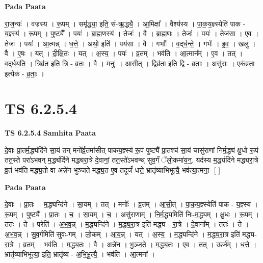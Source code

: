 \documentclass[17pt]{extarticle}
\begin{document}
\textbf{Pada Paata} \newline

रा॒ज॒न्यः॑ । वज्र॑स्य । रू॒पम् । समृ॑द्ध्या॒ इति॒ सं-ऋ॒द्ध्यै॒ । आ॒मिक्षा᳚ । वैश्य॑स्य । पा॒क॒य॒ज्ञ्स्येति॑ पाक - य॒ज्ञ्स्य॑ । रू॒पम् । पुष्ट्यै᳚ । पयः॑ । ब्रा॒ह्म॒णस्य॑ । तेजः॑ । वै । ब्रा॒ह्म॒णः । तेजः॑ । पयः॑ । तेज॑सा । ए॒व । तेजः॑ । पयः॑ । आ॒त्मन्न् । ध॒त्ते॒ । अथो॒ इति॑ । पय॑सा । वै । गर्भाः᳚ । व॒द्‌र्ध॒न्ते॒ । गर्भः॑ । इ॒व॒ । खलु॑ । वै । ए॒षः । यत् । दी॒क्षि॒तः । यत् । अ॒स्य॒ । पयः॑ । व्र॒तम् । भव॑ति । आ॒त्मान᳚म् । ए॒व । तत् । व॒द्‌र्ध॒य॒ति॒ । त्रिव्र॑त॒ इति॒ त्रि - व्र॒तः॒ । वै । मनुः॑ । आ॒सी॒त् । द्विव्र॑ता॒ इति॒ द्वि - व्र॒ताः॒ । असु॑राः । एक॑व्रता॒ इत्येक॑ - व्र॒ताः॒ ।  \newline




\section*{ TS 6.2.5.4 }

\textbf{TS 6.2.5.4 } \newline
\textbf{Samhita Paata} \newline

दे॒वाः प्रा॒तर्म॒द्ध्यंदि॑ने सा॒यं तन् मनो᳚र्व्र॒तमा॑सीत् पाकय॒ज्ञ्स्य॑ रू॒पं पुष्ट्यै᳚ प्रा॒तश्च॑ सा॒यं चासु॑राणां निर्म॒द्ध्यं क्षु॒धो रू॒पं तत॒स्ते परा॑ऽभवन् म॒द्ध्यंदि॑ने मद्ध्यरा॒त्रे दे॒वानां॒ तत॒स्ते॑ऽभवन्थ् सुव॒र्गं ॅलो॒कमा॑य॒न्॒. यद॑स्य म॒द्ध्यंदि॑ने मद्ध्यरा॒त्रे व्र॒तं भव॑ति मद्ध्य॒तो वा अन्ने॑न भुञ्जते मद्ध्य॒त ए॒व तदूर्जं॑ धत्ते॒ भ्रातृ॑व्याभिभूत्यै॒ भव॑त्या॒त्मना॒- [  ] \newline

\textbf{Pada Paata} \newline

दे॒वाः । प्रा॒तः । म॒द्ध्यन्दि॑ने । सा॒यम् । तत् । मनोः᳚ । व्र॒तम् । आ॒सी॒त् । पा॒क॒य॒ज्ञ्स्येति॑ पाक - य॒ज्ञ्स्य॑ । रू॒पम् । पुष्ट्यै᳚ । प्रा॒तः । च॒ । सा॒यम् । च॒ । असु॑राणाम् । नि॒र्म॒द्ध्यमिति॑ निः-म॒द्ध्यम् । क्षु॒धः । रू॒पम् । ततः॑ । ते । परेति॑ । अ॒भ॒व॒न्न् । म॒द्ध्यन्दि॑ने । म॒द्ध्य॒रा॒त्र इति॑ मद्ध्य - रा॒त्रे । दे॒वाना᳚म् । ततः॑ । ते । अ॒भ॒व॒न्न् । सु॒व॒र्गमिति॑ सुवः-गम् । लो॒कम् । आ॒य॒न्न् । यत् । अ॒स्य॒ । म॒द्ध्यन्दि॑ने । म॒द्ध्य॒रा॒त्र इति॑ मद्ध्य-रा॒त्रे । व्र॒तम् । भव॑ति । म॒द्ध्य॒तः । वै । अन्ने॑न । भु॒ञ्ज॒ते॒ । म॒द्ध्य॒तः । ए॒व । तत् । ऊर्ज᳚म् । ध॒त्ते॒ । भ्रातृ॑व्याभिभूत्या॒ इति॒ भ्रातृ॑व्य - अ॒भि॒भू॒त्यै॒ । भव॑ति । आ॒त्मना᳚ ।  \newline
\end{document}
